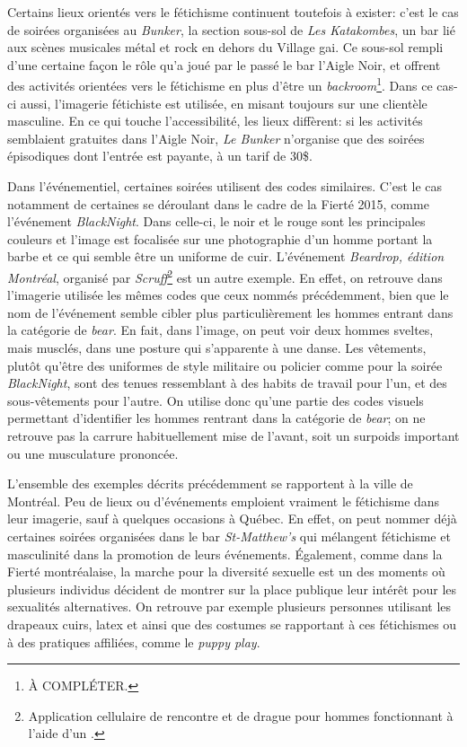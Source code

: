 Certains lieux orientés vers le fétichisme continuent toutefois à exister: c'est le cas de soirées organisées au \emph{Bunker}, la section sous-sol de \emph{Les Katakombes}, un bar lié aux scènes musicales métal et rock en dehors du Village gai.
Ce sous-sol rempli d'une certaine façon le rôle qu'a joué par le passé le bar l'Aigle Noir, et offrent des activités orientées vers le fétichisme en plus d'être un \emph{backroom}\footnote{À COMPLÉTER.}.
Dans ce cas-ci aussi, l'imagerie fétichiste est utilisée, en misant toujours sur une clientèle masculine.
En ce qui touche l'accessibilité, les lieux diffèrent: si les activités semblaient gratuites dans l'Aigle Noir, \emph{Le Bunker} n'organise que des soirées épisodiques dont l'entrée est payante, à un tarif de 30\$.

Dans l'événementiel, certaines soirées utilisent des codes similaires.
C'est le cas notamment de certaines se déroulant dans le cadre de la Fierté 2015, comme l'événement \emph{BlackNight}.
Dans celle-ci, le noir et le rouge sont les principales couleurs et l'image est focalisée sur une photographie d'un homme portant la barbe et ce qui semble être un uniforme de cuir.
L'événement \emph{Beardrop, édition Montréal}, organisé par \emph{Scruff}\footnote{Application cellulaire de rencontre et de drague pour hommes fonctionnant à l'aide d'un \gps{}.}
est un autre exemple.
En effet, on retrouve dans l'imagerie utilisée les mêmes codes que ceux nommés précédemment, bien que le nom de l'événement semble cibler plus particulièrement les hommes entrant dans la catégorie de \emph{bear}.
En fait, dans l'image, on peut voir deux hommes sveltes, mais musclés, dans une posture qui s'apparente à une danse.
Les vêtements, plutôt qu'être des uniformes de style militaire ou policier comme pour la soirée \emph{BlackNight}, sont des tenues ressemblant à des habits de travail pour l'un, et des sous-vêtements pour l'autre.
On utilise donc qu'une partie des codes visuels permettant d'identifier les hommes rentrant dans la catégorie de \emph{bear}; on ne retrouve pas la carrure habituellement mise de l'avant, soit un surpoids important ou une musculature prononcée.

L'ensemble des exemples décrits précédemment se rapportent à la ville de Montréal.
Peu de lieux ou d'événements emploient vraiment le fétichisme dans leur imagerie, sauf à quelques occasions à Québec.
En effet, on peut nommer déjà certaines soirées organisées dans le bar \emph{St-Matthew's} qui mélangent fétichisme et masculinité dans la promotion de leurs événements.
Également, comme dans la Fierté montréalaise, la marche pour la diversité sexuelle est un des moments où plusieurs individus décident de montrer sur la place publique leur intérêt pour les sexualités alternatives.
On retrouve par exemple plusieurs personnes utilisant les drapeaux cuirs, latex et \bdsm{} ainsi que des costumes se rapportant à ces fétichismes ou à des pratiques affiliées, comme le \emph{puppy play}.

